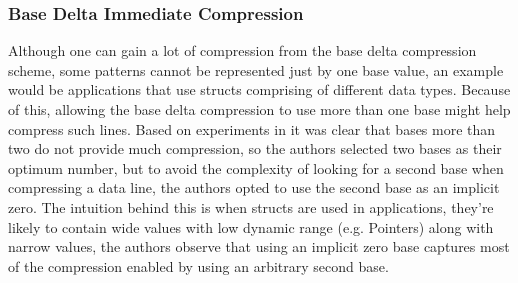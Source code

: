\subsubsection{Base Delta Immediate Compression}
Although one can gain a lot of compression from the base delta compression scheme, some patterns cannot be represented just by one base value, an example would be applications that use structs comprising of different data types. Because of this, allowing the base delta compression to use more than one base might help compress such lines. Based on experiments in \cite{bdi} it was clear that bases more than two do not provide much compression, so the authors selected two bases as their optimum number, but to avoid the complexity of looking for a second base when compressing a data line, the authors opted to use the second base as an implicit zero. The intuition behind this is when structs are used in applications, they're likely to contain wide values with low dynamic range (e.g. Pointers) along with narrow values, the authors observe that using an implicit zero base captures most of the compression enabled by using an arbitrary second base.
